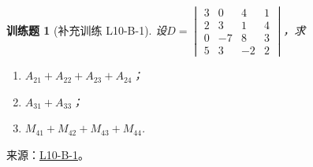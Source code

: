 \documentclass[12pt,fontset=fandol]{ctexart}
\newtheorem{exercise}{训练题}[section]
\begin{document}
\begin{exercise}[补充训练 L10-B-1]\label{prob:L10-B-1}
设$D=\begin{vmatrix}
                3 & 0 & 4 & 1 \\ 2 & 3 & 1 & 4 \\ 0 & -7 & 8 & 3 \\ 5 & 3 & -2 & 2
            \end{vmatrix}$，求
        \begin{enumerate}
            \item $A_{21}+A_{22}+A_{23}+A_{24}$；

            \item $A_{31}+A_{33}$；

            \item $M_{41}+M_{42}+M_{43}+M_{44}$.
        \end{enumerate}
\end{exercise}
\noindent 来源：\href{https://github.com/yhwu-is/Linear-Algebra-Left-Undone/blob/new/%E8%AE%B2%E4%B9%89/%E4%B8%93%E9%A2%98/10%20%E8%A1%8C%E5%88%97%E5%BC%8F.tex}{L10-B-1}。
\end{document}
